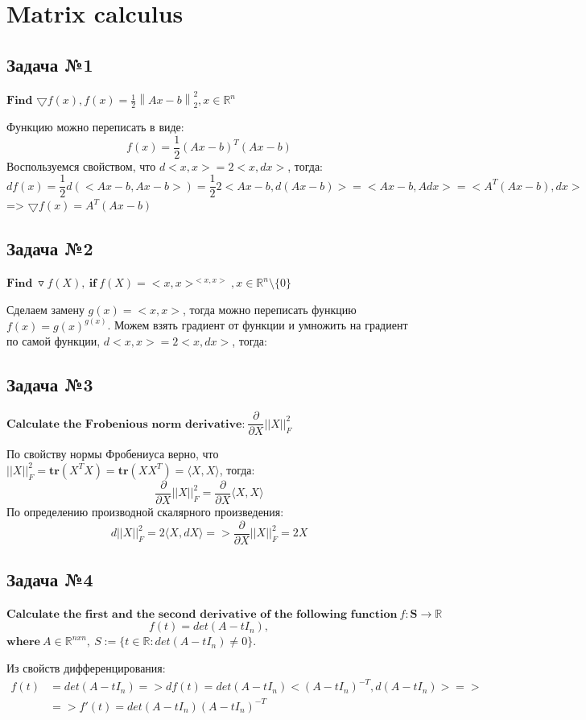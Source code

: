 \documentclass[12pt,letterpaper]{article}
\begin{document}
\section{Matrix calculus}
\subsection*{Задача №1}
$\textbf{Find}$ $\bigtriangledown f(x), f(x)= \frac{1}{2} {\left \| Ax-b \right \|}^2_2 , x \in \mathbb{R}^n$

Функцию можно переписать в виде:
$$ f(x)=\frac{1}{2}(Ax-b)^T(Ax-b)$$
Воспользуемся свойством, что $d<x,x>=2<x,dx>$, тогда:
$$ df(x)=\frac{1}{2}d(<Ax-b,Ax-b>)=\frac{1}{2}2<Ax-b,d(Ax-b)>=<Ax-b,Adx>=<A^T(Ax-b),dx>$$
=> $\bigtriangledown f(x)= A^T(Ax-b)$

\subsection*{Задача №2}
$\textbf{Find}\ \triangledown f(X),\ \textbf{if}\ f(X)=<x,x>^{<x,x>}, x\in \mathbb{R}^n\setminus\{0\} $

Сделаем замену $g(x)=<x,x>$, тогда можно переписать функцию $f(x)=g(x)^{g(x)}$. Можем взять градиент от функции и умножить на градиент по самой функции, $d<x,x>=2<x,dx>$, тогда:


\subsection*{Задача №3}
$\textbf{Calculate the Frobenious norm derivative:}\ \dfrac{\partial}{\partial X}||X||_F^2$

По свойству нормы Фробениуса верно, что $ ||X||_F^2 =  \mathbf{tr} \left( X^T X \right) = \mathbf{tr} \left(X X^T \right) = \langle X, X \rangle $, тогда: 
$$
\dfrac{\partial}{\partial X}||X||_F^2 = \dfrac{\partial}{\partial X} \langle X, X \rangle 
$$
По определению производной скалярного произведения:
$$
d ||X||_F^2 = 2 \langle X, d X \rangle =>  \dfrac{\partial}{\partial X}||X||_F^2 = 2 X 
$$

\subsection*{Задача №4}
$\textbf{Calculate the first and the second derivative of the following function}\ f: \textbf{S}\rightarrow\mathbb{R}$
$$f(t)=det(A-tI_n),$$
$\textbf{where}\ A\in\mathbb{R}^{nxn},\ S:=\{t\in\mathbb{R}:det(A-tI_n)\neq0\}. $

Из свойств дифференцирования:
$$
\begin{aligned}
f(t)&=det(A-tI_n)=>df(t)=det(A-tI_n)<(A-tI_n)^{-T},d(A-tI_n)> => \\ &=>f'(t)=det(A-tI_n)(A-tI_n)^{-T}
\end{aligned}
$$
\end{document}
